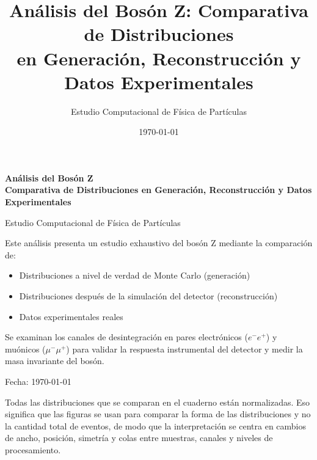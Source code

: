 \documentclass[11pt]{article}
\title{Análisis del Bosón Z: Comparativa de Distribuciones\\en Generación, Reconstrucción y Datos Experimentales}
\author{Estudio Computacional de Física de Partículas}
\date{\today}
\begin{document}
\begin{titlepage}
    \centering
    \vspace*{\fill}
    
    {\Huge \textbf{Análisis del Bosón Z}} \\
    \vspace{0.5cm}
    {\Large \textbf{Comparativa de Distribuciones en Generación, Reconstrucción y Datos Experimentales}}
    
    \vspace{2cm}
    
    {\large Estudio Computacional de Física de Partículas}
    
    \vspace{3cm}
    
    {\normalsize 
    Este análisis presenta un estudio exhaustivo del bosón Z mediante la comparación de:
    \begin{itemize}
        \item Distribuciones a nivel de verdad de Monte Carlo (generación)
        \item Distribuciones después de la simulación del detector (reconstrucción)
        \item Datos experimentales reales
    \end{itemize}
    
    Se examinan los canales de desintegración en pares electrónicos ($e^-e^+$) y muónicos ($\mu^-\mu^+$)
    para validar la respuesta instrumental del detector y medir la masa invariante del bosón.
    }
    
    \vspace{2cm}
    
    {\normalsize Fecha: \today}
    
    \vspace*{\fill}
\end{titlepage}

\newpage
\tableofcontents
\newpage

    
    Todas las distribuciones que se comparan en el cuaderno están
normalizadas. Eso significa que las figuras se usan para comparar la
forma de las distribuciones y no la cantidad total de eventos, de modo
que la interpretación se centra en cambios de ancho, posición, simetría
y colas entre muestras, canales y niveles de procesamiento.
\end{document}
